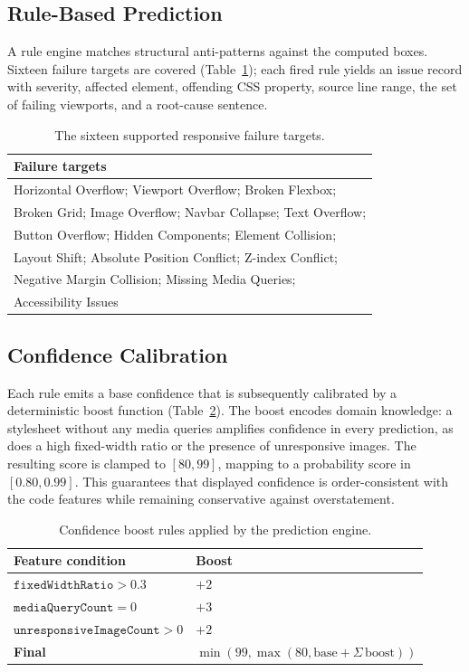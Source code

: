 \documentclass[conference]{IEEEtran}
\begin{document}
\subsection{Rule-Based Prediction}
A rule engine matches structural anti-patterns against the
computed boxes. Sixteen failure targets are covered (Table~\ref{tab:targets});
each fired rule yields an issue record with severity, affected element,
offending CSS property, source line range, the set of failing
viewports, and a root-cause sentence.

\begin{table}[!t]
\caption{The sixteen supported responsive failure targets.}
\label{tab:targets}
\centering
\small
\begin{tabular}{@{}l@{}}
\toprule
\textbf{Failure targets} \\
\midrule
Horizontal Overflow; Viewport Overflow; Broken Flexbox; \\
Broken Grid; Image Overflow; Navbar Collapse; Text Overflow; \\
Button Overflow; Hidden Components; Element Collision; \\
Layout Shift; Absolute Position Conflict; Z-index Conflict; \\
Negative Margin Collision; Missing Media Queries; \\
Accessibility Issues \\
\bottomrule
\end{tabular}
\end{table}

\subsection{Confidence Calibration}
Each rule emits a base confidence that is subsequently calibrated by a
deterministic boost function (Table~\ref{tab:boosts}). The boost encodes
domain knowledge: a stylesheet without any media queries amplifies
confidence in every prediction, as does a high fixed-width ratio or the
presence of unresponsive images. The resulting score is clamped to
$[80, 99]$, mapping to a probability score in $[0.80, 0.99]$. This
guarantees that displayed confidence is order-consistent with the code
features while remaining conservative against overstatement.

\begin{table}[!t]
\caption{Confidence boost rules applied by the prediction engine.}
\label{tab:boosts}
\centering
\small
\begin{tabular}{@{}ll@{}}
\toprule
\textbf{Feature condition} & \textbf{Boost} \\
\midrule
$\texttt{fixedWidthRatio} > 0.3$ & $+2$ \\
$\texttt{mediaQueryCount} = 0$ & $+3$ \\
$\texttt{unresponsiveImageCount} > 0$ & $+2$ \\
\midrule
\textbf{Final} & $\min(99, \max(80, \text{base} + \Sigma\, \text{boost}))$ \\
\bottomrule
\end{tabular}
\end{table}
\end{document}
